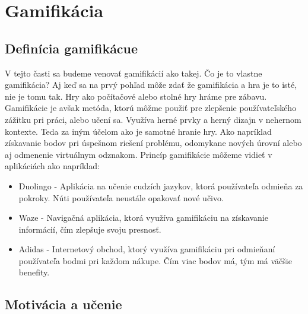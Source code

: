 \documentclass[10pt,oneside,slovak,a4paper]{article}
\begin{document}
\section{Gamifikácia} \label{gamifikacia}
\subsection{Definícia gamifikácue} \label{definicia}
V tejto časti sa budeme venovať gamifikácií ako takej. Čo je to vlastne gamifikácia? Aj keď sa na prvý pohľad môže zdať že gamifikácia a hra je to isté, nie je tomu tak. Hry ako počítačové alebo stolné hry hráme pre zábavu. Gamifikácie je avšak metóda, ktorú môžme použiť pre zlepšenie používateľského zážitku pri práci, alebo učení sa. Využíva herné prvky a herný dizajn v nehernom kontexte. Teda za iným účelom ako je samotné hranie hry. Ako napríklad získavanie bodov pri úspešnom riešení problému, odomykane nových úrovní alebo aj odmenenie virtuálnym odznakom. Princíp gamifikácie môžeme vidieť v aplikáciách ako napríklad:

\begin{itemize}
    \item Duolingo - Aplikácia na učenie cudzích jazykov, ktorá používateľa odmieňa za pokroky. Núti používateľa neustále opakovať nové učivo.
    \item Waze - Navigačná aplikácia, ktorá využíva gamifikáciu na získavanie informácií, čím zlepšuje svoju presnosť.
    \item Adidas - Internetový obchod, ktorý využíva gamifikáciu pri odmieňaní používateľa bodmi pri každom nákupe. Čím viac bodov má, tým má väčšie benefity.
\end{itemize}

\subsection{Motivácia a učenie} \label{motivacia}




\end{document}
